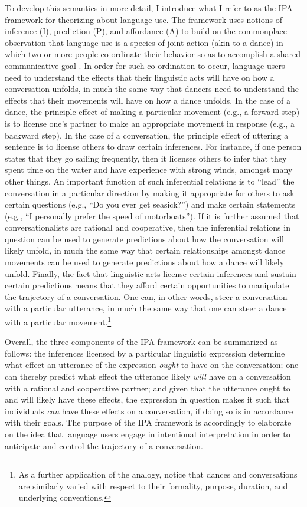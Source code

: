 To develop this semantics in more detail, I introduce what I refer to as the IPA framework for theorizing about language use. The framework uses notions of inference (I), prediction (P), and affordance (A) to build on the commonplace observation that language use is a species of joint action (akin to a dance) in which two or more people co-ordinate their behavior so as to accomplish a shared communicative goal \citep{Clark:1996,Lewis:1975,Brandom:2010}. In order for such co-ordination to occur, language users need to understand the effects that their linguistic acts will have on how a conversation unfolds, in much the same way that dancers need to understand the effects that their movements will have on how a dance unfolds. In the case of a dance, the principle effect of making a particular movement (e.g., a forward step) is to license one's partner to make an appropriate movement in response (e.g., a backward step). In the case of a conversation, the principle effect of uttering a sentence is to license others to draw certain inferences. For instance, if one person states that they go sailing frequently, then it licenses others to infer that they spent time on the water and have experience with strong winds, amongst many other things. An important function of such inferential relations is to ``lead'' the conversation in a particular direction by making it appropriate for others to ask certain questions (e.g., ``Do you ever get seasick?'') and make certain statements (e.g., ``I personally prefer the speed of motorboats''). If it is further assumed that conversationalists are rational and cooperative, then the inferential relations in question can be used to generate predictions about how the conversation will likely unfold, in much the same way that certain relationships amongst dance movements can be used to generate predictions about how a dance will likely unfold. Finally, the fact that linguistic acts license certain inferences and sustain certain predictions means that they afford certain opportunities to manipulate the trajectory of a conversation. One can, in other words, steer a conversation with a particular utterance, in much the same way that one can steer a dance with a particular movement.\footnote{As a further application of the analogy, notice that dances and conversations are similarly varied with respect to their formality, purpose, duration, and underlying conventions.}

Overall, the three components of the IPA framework can be summarized as follows: the inferences licensed by a particular linguistic expression determine what effect an utterance of the expression \textit{ought} to have on the conversation; one can thereby predict what effect the utterance likely \textit{will} have on a conversation with a rational and cooperative partner; and given that the utterance ought to and will likely have these effects, the expression in question makes it such that individuals \textit{can} have these effects on a conversation, if doing so is in accordance with their goals. The purpose of the IPA framework is accordingly to elaborate on the idea that language users engage in intentional interpretation in order to anticipate and control the trajectory of a conversation.

